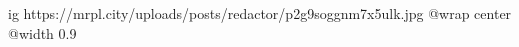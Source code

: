  
 
 
 
 

\ifcmt
  ig https://mrpl.city/uploads/posts/redactor/p2g9soggnm7x5ulk.jpg
  @wrap center
  @width 0.9
\fi
